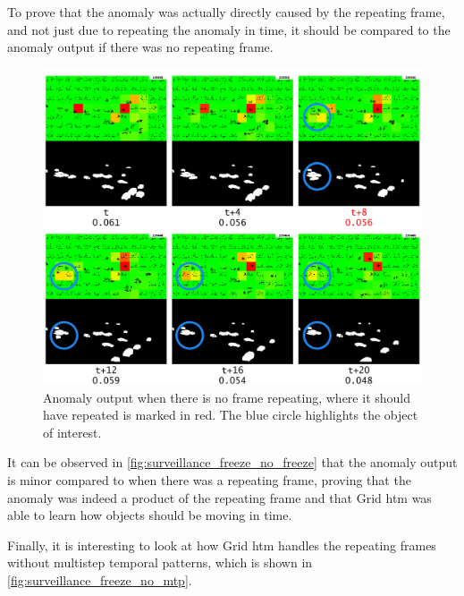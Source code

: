 \par
To prove that the anomaly was actually directly caused by the repeating frame, and not just due to repeating the anomaly in time, it should be compared to the anomaly output if there was no repeating frame.
\begin{figure}[H]
    \centering
    \includegraphics[width=\textwidth]{resources/experiments/surveillance/surveillance_freeze_no_freeze.png}
    \caption[No Frame Repeat Anomaly]{Anomaly output when there is no frame repeating, where it should have repeated is marked in red. The blue circle highlights the object of interest.}
    \label{fig:surveillance_freeze_no_freeze}
\end{figure}
It can be observed in \autoref{fig:surveillance_freeze_no_freeze} that the anomaly output is minor compared to when there was a repeating frame, proving that the anomaly was indeed a product of the repeating frame and that Grid \gls*{htm} was able to learn how objects should be moving in time.
\par
Finally, it is interesting to look at how Grid \gls*{htm} handles the repeating frames without multistep temporal patterns, which is shown in \autoref{fig:surveillance_freeze_no_mtp}.
